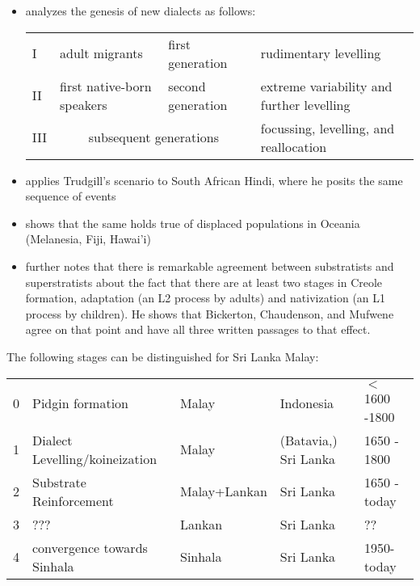 \documentclass[a4paper,12pt]{article}
\begin{document}
\begin{itemize}
 \item \citet{Trudgill1986} analyzes the genesis of new dialects as follows:

\begin{tabular}{llll}
 I & adult migrants & first generation & rudimentary levelling\\
II & first native-born speakers & second generation & extreme variability and further levelling\\
III& \multicolumn{2}{c}{subsequent generations} & focussing, levelling, and reallocation \citep[200]{TrudgKers2005}
\end{tabular}

 \item \citet{Meshtrie1993} applies Trudgill's scenario to South African Hindi, where he posits the same sequence of events

 \item \citet{Siegel} shows that the same holds true of displaced populations in Oceania (Melanesia, Fiji, Hawai'i)

 \item \citet{Siegel2008} further notes that there is remarkable agreement between substratists and superstratists about the fact that there are at least two stages in Creole formation, adaptation (an L2 process by adults) and nativization (an L1 process by children). He shows that Bickerton, Chaudenson, and Mufwene agree on that point and have all three written passages to that effect. 
\end{itemize}  

The following stages can be distinguished for Sri Lanka Malay:
 
\begin{table}[h]
\begin{tabular}{lllll}
  0 & Pidgin formation 		 	& Malay 	& Indonesia 		& $<$1600 -1800\\
  1 & Dialect Levelling/koineization    & Malay 	& (Batavia,) Sri Lanka 	& 1650 - 1800\\
  2 & Substrate Reinforcement 		& Malay+Lankan	& Sri Lanka 		& 1650 - today\\ 
  3 & ???                     		& Lankan	& Sri Lanka 		& ?? \\
  4 & convergence towards Sinhala 	& Sinhala	& Sri Lanka 		& 1950-today\\ 
\end{tabular}
\end{table}
\end{document}
